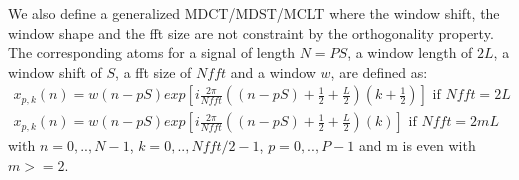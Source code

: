 \documentclass[11pt,a4paper]{article}
\begin{document}
We also define a generalized MDCT/MDST/MCLT where the window shift, the window shape and the fft size are not constraint by the orthogonality property. The corresponding atoms for a signal of length $N=PS$, a window length of $2L$, a window shift of $S$, a fft size of $Nfft$ and a window $w$, are defined as:
\begin{eqnarray}
x_{p,k}(n) = w(n-pS) exp \left[ i \frac{2\pi}{Nfft} \left( (n-pS) + \frac{1}{2} + \frac{L}{2} \right) \left( k + \frac{1}{2} \right) \right] \mbox{ if } Nfft=2L \\
x_{p,k}(n) = w(n-pS) exp \left[ i \frac{2\pi}{Nfft} \left( (n-pS) + \frac{1}{2} + \frac{L}{2} \right) \left( k  \right) \right] \mbox{ if }Nfft=2mL
\end{eqnarray}
with $n=0,..,N-1$, $k=0,..,Nfft/2-1$, $p=0,..,P-1$ and m is even with $m>=2$.
\end{document}

